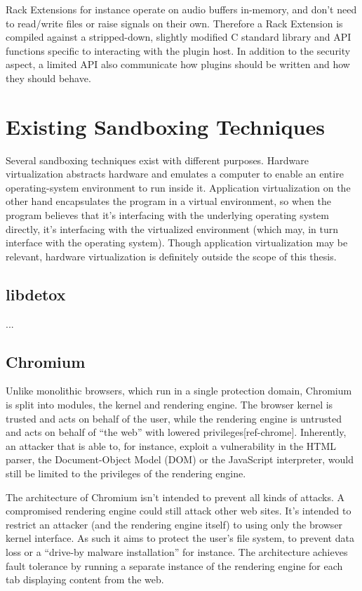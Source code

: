 Rack Extensions for instance operate on audio buffers in-memory, and don't need
to read/write files or raise signals on their own. Therefore a Rack Extension is
compiled against a stripped-down, slightly modified C standard library and API
functions specific to interacting with the plugin host. In addition to the
security aspect, a limited API also communicate how plugins should be written
and how they should behave.


\section {Existing Sandboxing Techniques}

Several sandboxing techniques exist with different purposes. Hardware
virtualization abstracts hardware and emulates a computer to enable an entire
operating-system environment to run inside it. Application virtualization on the
other hand encapsulates the program in a virtual environment, so when the
program believes that it's interfacing with the underlying operating system
directly, it's interfacing with the virtualized environment (which may, in turn
interface with the operating system). Though application virtualization may be
relevant, hardware virtualization is definitely outside the scope of this
thesis.

\subsection {libdetox}

...

\subsection {Chromium}

Unlike monolithic browsers, which run in a single protection domain, Chromium
is split into modules, the kernel and rendering engine. The browser kernel is
trusted and acts on behalf of the user, while the rendering engine is untrusted
and acts on behalf of ``the web'' with lowered privileges[ref-chrome].
Inherently, an attacker that is able to, for instance, exploit a vulnerability
in the HTML parser, the Document-Object Model (DOM) or the JavaScript
interpreter, would still be limited to the privileges of the rendering engine.

The architecture of Chromium isn't intended to prevent all kinds of attacks. A
compromised rendering engine could still attack other web sites. It's intended
to restrict an attacker (and the rendering engine itself) to using only the
browser kernel interface. As such it aims to protect the user's file system, to
prevent data loss or a ``drive-by malware installation'' for instance. The
architecture achieves fault tolerance by running a separate instance of the
rendering engine for each tab displaying content from the web.

